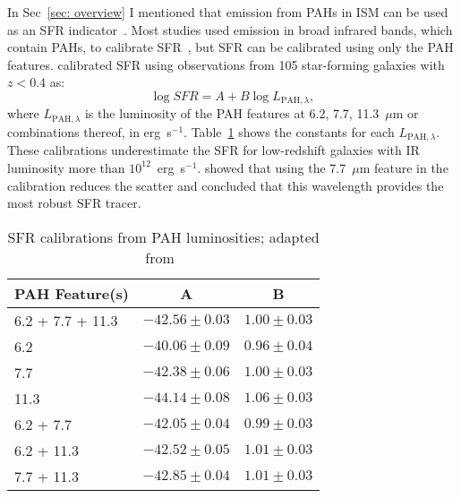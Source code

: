 In Sec~\ref{sec: overview} I mentioned that emission from PAHs in ISM can be used as an SFR indicator~\citep[e.g.][]{Peeters04}.
Most studies used emission in broad infrared bands, which contain PAHs, to calibrate SFR~\citep[e.g.][]{Calzetti07}, but SFR can be calibrated using only the PAH features.
\cite{Shipley16} calibrated SFR using observations from 105 star-forming galaxies with $z < 0.4$ as:
\begin{equation}
\log SFR = A + B \log L_{\mathrm{PAH}, \lambda},
\end{equation}
where $L_{\mathrm{PAH}, \lambda}$ is the luminosity of the PAH features at 6.2, 7.7, 11.3~$\mu$m or combinations thereof, in erg~s$^{-1}$.
Table~\ref{table_PAH} shows the constants for each $L_{\mathrm{PAH}, \lambda}$.
These calibrations underestimate the SFR for low-redshift galaxies with IR luminosity more than $10^{12}$~erg~s$^{-1}$.
\cite{Shipley16} showed that using the 7.7~$\mu$m feature in the calibration reduces the scatter and concluded that this wavelength provides the most robust SFR tracer.


\begin{table}
\caption{SFR calibrations from PAH luminosities; adapted from~\cite{Shipley16}}
\label{table_PAH}
\begin{center}
\begin{tabular}{ l c c}
\hline\hline
PAH Feature(s) & A & B\\
\hline
6.2 + 7.7 + 11.3 & $ -42.56 \pm 0.03 $ &  $1.00 \pm 0.03$ \\ 
6.2 & $ -40.06 \pm 0.09 $ &  $0.96 \pm 0.04$ \\ 
7.7 & $ -42.38 \pm 0.06 $ &  $1.00 \pm 0.03$ \\ 
11.3 & $ -44.14 \pm 0.08 $ &  $1.06 \pm 0.03$ \\ 
6.2 + 7.7 & $ -42.05 \pm 0.04 $ &  $0.99 \pm 0.03$ \\ 
6.2 + 11.3 & $ -42.52 \pm 0.05 $ &  $1.01 \pm 0.03$ \\ 
7.7 + 11.3 & $ -42.85 \pm 0.04 $ &  $1.01 \pm 0.03$ \\ 
\hline
\end{tabular}
\end{center}
\end{table}  


